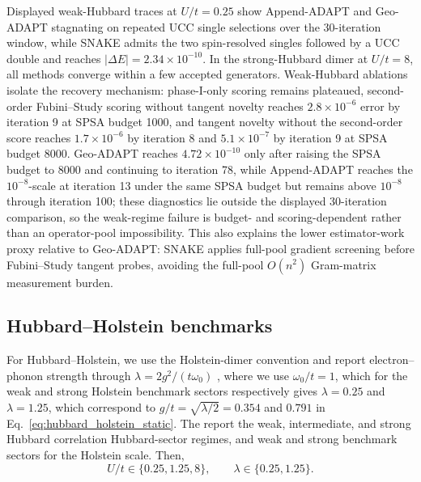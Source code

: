 \documentclass[
  reprint,
  amsmath,
  amssymb,
  aps,
  pra,
  nofootinbib,
  superscriptaddress,
  floatfix
]{revtex4-2}
\begin{document}
Displayed weak-Hubbard traces at \(U/t=0.25\) show Append-ADAPT and Geo-ADAPT stagnating on repeated UCC single selections over the 30-iteration window, while SNAKE admits the two spin-resolved singles followed by a UCC double and reaches \(|\Delta E|=2.34\times10^{-10}\).
In the strong-Hubbard dimer at \(U/t=8\), all methods converge within a few accepted generators.
Weak-Hubbard ablations isolate the recovery mechanism: phase-I-only scoring remains plateaued, second-order Fubini--Study scoring without tangent novelty reaches \(2.8\times10^{-6}\) error by iteration 9 at SPSA budget 1000, and tangent novelty without the second-order score reaches \(1.7\times10^{-6}\) by iteration 8 and \(5.1\times10^{-7}\) by iteration 9 at SPSA budget 8000.
Geo-ADAPT reaches \(4.72\times10^{-10}\) only after raising the SPSA budget to 8000 and continuing to iteration 78, while Append-ADAPT reaches the \(10^{-8}\)-scale at iteration 13 under the same SPSA budget but remains above \(10^{-8}\) through iteration 100; these diagnostics lie outside the displayed 30-iteration comparison, so the weak-regime failure is budget- and scoring-dependent rather than an operator-pool impossibility.
This also explains the lower estimator-work proxy relative to Geo-ADAPT: SNAKE applies full-pool gradient screening before Fubini--Study tangent probes, avoiding the full-pool \(O(n^2)\) Gram-matrix measurement burden.

\subsection{Hubbard--Holstein benchmarks}

For Hubbard--Holstein, we use the Holstein-dimer convention and report electron--phonon strength through \(\lambda=2g^2/(t\omega_0)\) \cite{Sakkinen2015HolsteinDimer}, where  we use
\(\omega_0/t=1\), which for the weak and strong Holstein benchmark sectors respectively gives
\(\lambda=0.25\) and \(\lambda=1.25\), which correspond to
\(g/t=\sqrt{\lambda/2}=0.354\) and \(0.791\) in Eq.~\eqref{eq:hubbard_holstein_static}. 
The report the weak, intermediate, and strong Hubbard correlation Hubbard-sector regimes, and weak and strong benchmark sectors for the Holstein scale. Then,
\[
U/t\in\{0.25,1.25,8\},\qquad \lambda\in\{0.25,1.25\}.
\]
\end{document}
